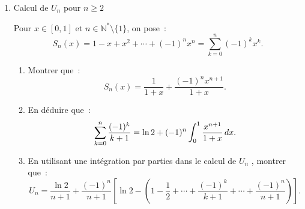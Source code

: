 \begin{exercice}
\begin{enumerate}
\item Calcul de $U_n$ pour $n\geqslant 2$


Pour $x\in [0,1]$ et $n\in \mathbb{N}^*\setminus \{1\}$, on pose~: 
\begin{equation*}
S_n(x)=1-x+x^2+\cdots+(-1)^nx^n=\sum_{k=0}^n(-1)^kx^k.
\end{equation*}

\begin{enumerate}
\item Montrer que~: 
\begin{equation*}
S_{n}(x)=\frac{1}{1+x}+\frac{(-1)^{n}x^{n+1}}{1+x}.
\end{equation*}

\item En d\'{e}duire que~: 
\begin{equation*}
\sum_{k=0}^{n}\frac{(-1)^{k}}{k+1}=\ln 2+(-1)^{n}\int_{0}^{1}\frac{x^{n+1}}{%
1+x}\,dx.
\end{equation*}

\item En utilisant une int\'{e}gration par parties dans le calcul de $U_{n}$%
, montrer que~: 
\begin{equation*}
U_{n}=\frac{\ln 2}{n+1}+\frac{(-1)^{n}}{n+1}\left[ \ln 2-\left( 1-\frac{1}{2}%
+\cdots +\frac{(-1)^{k}}{k+1}+\cdots +\frac{(-1)^{n}}{n+1}\right) \right] .
\end{equation*}
\end{enumerate}

\end{enumerate}

\end{exercice}





